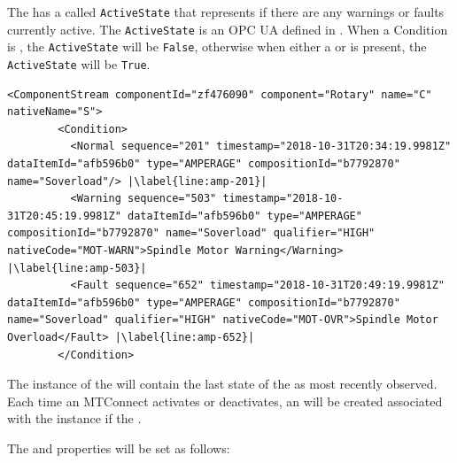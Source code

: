 The  has a  called \texttt{ActiveState} that represents if there are any warnings or faults currently active. The \texttt{ActiveState} is an OPC UA  defined in \cite{UAPart8}. When a Condition is , the \texttt{ActiveState} will be \texttt{False}, otherwise when either a  or  is present, the \texttt{ActiveState} will be \texttt{True}.

\begin{lstlisting}[firstnumber=last,escapechar=|,%
    caption={Rotary C Component Stream},label={lst:rotary-component-stream}]
      <ComponentStream componentId="zf476090" component="Rotary" name="C" nativeName="S">
        <Condition>
          <Normal sequence="201" timestamp="2018-10-31T20:34:19.9981Z" dataItemId="afb596b0" type="AMPERAGE" compositionId="b7792870" name="Soverload"/> |\label{line:amp-201}|
          <Warning sequence="503" timestamp="2018-10-31T20:45:19.9981Z" dataItemId="afb596b0" type="AMPERAGE" compositionId="b7792870" name="Soverload" qualifier="HIGH" nativeCode="MOT-WARN">Spindle Motor Warning</Warning> |\label{line:amp-503}|
          <Fault sequence="652" timestamp="2018-10-31T20:49:19.9981Z" dataItemId="afb596b0" type="AMPERAGE" compositionId="b7792870" name="Soverload" qualifier="HIGH" nativeCode="MOT-OVR">Spindle Motor Overload</Fault> |\label{line:amp-652}|
        </Condition>
\end{lstlisting}

The instance of the  will contain the last state of the  as most recently observed. Each time an MTConnect  activates or deactivates, an   will be created associated with the instance if the  . 

The  and  properties will be set as follows:

